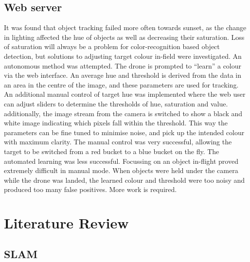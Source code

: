 \documentclass{article}
\begin{document}
	\subsection{Web server}
It was found that object tracking failed more often towards sunset, as the change in lighting affected the hue of objects as well as decreasing their saturation. Loss of saturation will always be a problem for color-recognition based object detection, but solutions to adjusting target colour in-field were investigated. 
An autonomous method was attempted. The drone is prompted to “learn” a colour via the web interface. An average hue and threshold is derived from the data in an area in the centre of the image, and these parameters are used for tracking. 
An additional manual control of target hue was implemented where the web user can adjust sliders to determine the thresholds of hue, saturation and value. additionally, the image stream from the camera is switched to show a black and white image indicating which pixels fall within the threshold. This way the parameters can be fine tuned to minimise noise, and pick up the intended colour with maximum clarity.
The manual control was very successful, allowing the target to be switched from a red bucket to a blue bucket on the fly.
The automated learning was less successful. Focussing on an object in-flight proved extremely difficult in manual mode. When objects were held under the camera while the drone was landed, the learned colour and threshold were too noisy and produced too many false positives. More work is required.

\section{Literature Review}
	\subsection{SLAM}
\end{document}
